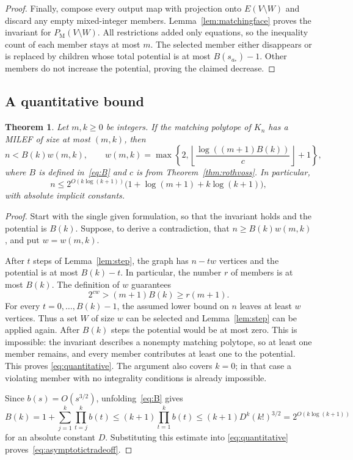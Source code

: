 \documentclass[11pt]{article}
\newtheorem{theorem}{Theorem}
\theoremstyle{definition}
\newcommand{\PM}{P_{\mathrm M}}
\begin{document}
\begin{proof}
Finally, compose every output map with projection onto $E(V\setminus W)$
and discard any empty mixed-integer members. Lemma~\ref{lem:matchingface}
proves the invariant for $\PM(V\setminus W)$. All restrictions added only
equations, so the inequality count of each member stays at most $m$.
The selected member either disappears or is replaced by children whose
total potential is at most $B(s_{a_*})-1$. Other members do not increase
the potential, proving the claimed decrease.
\end{proof}

\subsection{A quantitative bound}

\begin{theorem}\label{thm:quantitative}
Let $m,k\geq0$ be integers. If the matching polytope of $K_n$ has a MILEF
of size at most $(m,k)$, then
\begin{equation}\label{eq:quantitative}
 n<B(k)w(m,k),\qquad
 w(m,k)=\max\left\{2,\left\lfloor
 \frac{\log((m+1)B(k))}{c}\right\rfloor+1\right\},
\end{equation}
where $B$ is defined in~\eqref{eq:B} and $c$ is from
Theorem~\ref{thm:rothvoss}. In particular,
\begin{equation}\label{eq:asymptotictradeoff}
 n\leq 2^{O(k\log(k+1))}
 \bigl(1+\log(m+1)+k\log(k+1)\bigr),
\end{equation}
with absolute implicit constants.
\end{theorem}

\begin{proof}
Start with the single given formulation, so that the invariant holds and the
potential is $B(k)$. Suppose, to derive a contradiction, that
$n\geq B(k)w(m,k)$, and put $w=w(m,k)$.

After $t$ steps of Lemma~\ref{lem:step}, the graph has $n-tw$ vertices and
the potential is at most $B(k)-t$. In particular, the number $r$ of members
is at most $B(k)$. The definition of $w$ guarantees
\[
 2^{cw}>(m+1)B(k)\geq r(m+1).
\]
For every $t=0,\ldots,B(k)-1$, the assumed lower bound on $n$ leaves
at least $w$ vertices. Thus a set $W$ of size $w$ can be selected and
Lemma~\ref{lem:step} can be applied again. After $B(k)$ steps the
potential would be at most zero. This is impossible: the invariant describes
a nonempty matching polytope, so at least one member remains, and every
member contributes at least one to the potential. This proves
\eqref{eq:quantitative}. The argument also covers $k=0$; in that case a
violating member with no integrality conditions is already impossible.

Since $b(s)=O(s^{3/2})$, unfolding~\eqref{eq:B} gives
\[
 B(k)=1+\sum_{j=1}^k\prod_{t=j}^k b(t)
 \leq (k+1)\prod_{t=1}^k b(t)
 \leq (k+1)D^k(k!)^{3/2}
 =2^{O(k\log(k+1))}
\]
for an absolute constant $D$. Substituting this estimate into
\eqref{eq:quantitative} proves~\eqref{eq:asymptotictradeoff}.
\end{proof}
\end{document}
